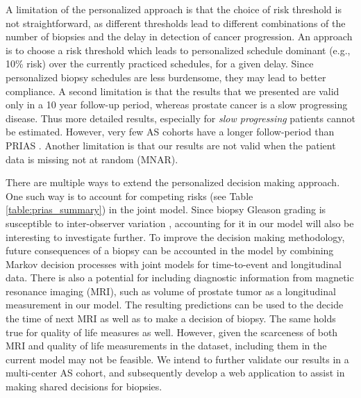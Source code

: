 A limitation of the personalized approach is that the choice of risk threshold is not straightforward, as different thresholds lead to different combinations of the number of biopsies and the delay in detection of cancer progression. An approach is to choose a risk threshold which leads to personalized schedule dominant (e.g., 10\% risk) over the currently practiced schedules, for a given delay. Since personalized biopsy schedules are less burdensome, they may lead to better compliance. A second limitation is that the results that we presented are valid only in a 10 year follow-up period, whereas prostate cancer is a slow progressing disease. Thus more detailed results, especially for \textit{slow progressing} patients cannot be estimated. However, very few AS cohorts have a longer follow-period than PRIAS \cite{bruinsma2016active}. Another limitation is that our results are not valid when the patient data is missing not at random (MNAR).

There are multiple ways to extend the personalized decision making approach. One such way is to account for competing risks (see Table \ref{table:prias_summary}) in the joint model. Since biopsy Gleason grading is susceptible to inter-observer variation \cite{coley2017}, accounting for it in our model will also be interesting to investigate further. To improve the decision making methodology, future consequences of a biopsy can be accounted in the model by combining Markov decision processes with joint models for time-to-event and longitudinal data. There is also a potential for including diagnostic information from magnetic resonance imaging (MRI), such as volume of prostate tumor as a longitudinal measurement in our model. The resulting predictions can be used to the decide the time of next MRI as well as to make a decision of biopsy. The same holds true for quality of life measures as well. However, given the scarceness of both MRI and quality of life measurements in the dataset, including them in the current model may not be feasible. We intend to further validate our results in a multi-center AS cohort, and subsequently develop a web application to assist in making shared decisions for biopsies.